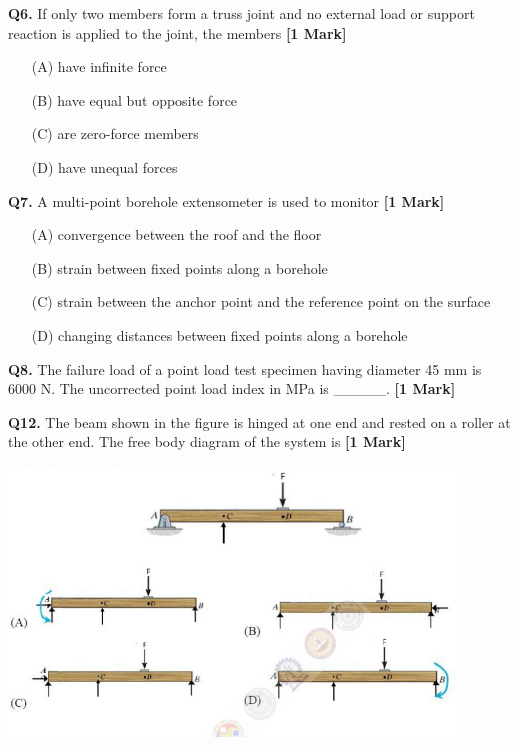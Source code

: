 \documentclass[11pt]{article}
\newcommand{\questiona}[2]{
    \noindent\textbf{Q#2.} #1 \hfill \textbf{[1 Mark]}
}
\begin{document}
\questiona{If only two members form a truss joint and no external load or support reaction is applied to the joint, the members}{6}
\begin{enumerate}
    \item[(A)] have infinite force  
    \item[(B)] have equal but opposite force  
    \item[(C)] are zero-force members  
    \item[(D)] have unequal forces  
\end{enumerate}
\vspace{0.5cm}

\questiona{A multi-point borehole extensometer is used to monitor}{7}
\begin{enumerate}
    \item[(A)] convergence between the roof and the floor  
    \item[(B)] strain between fixed points along a borehole  
    \item[(C)] strain between the anchor point and the reference point on the surface  
    \item[(D)] changing distances between fixed points along a borehole  
\end{enumerate}
\vspace{0.5cm}

\questiona{The failure load of a point load test specimen having diameter 45 mm is 6000 N. The uncorrected point load index in MPa is \_\_\_\_\_.}{8}
\vspace{0.5cm}

\questiona{The beam shown in the figure is hinged at one end and rested on a roller at the other end. The free body diagram of the system is}{12}
\begin{center}
\includegraphics[width=0.9\textwidth]{figures/9.png}
\end{center}
\vspace{0.5cm}
\end{document}
